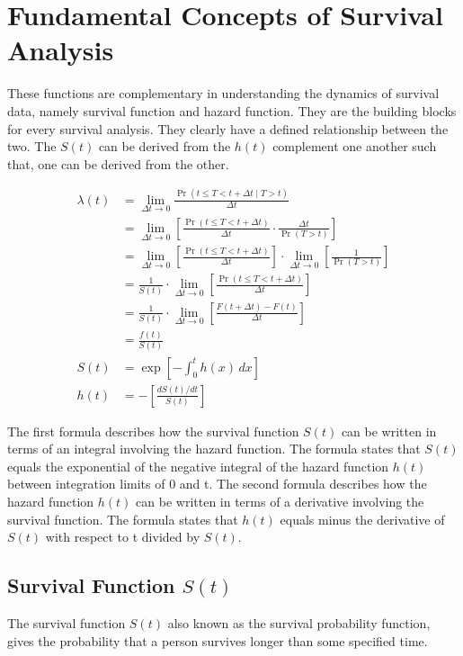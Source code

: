 \documentclass[doublespacing]{report} %
\begin{document}
\section{Fundamental Concepts of Survival Analysis}

These functions are complementary in understanding the dynamics of survival data, namely survival function and hazard function. They are the building blocks for every survival analysis. They clearly have a defined relationship between the two. The \(S\left(t\right)\) can be derived from the \(h\left(t\right)\) complement one another such that, one can be derived from the other.

\begin{align}
\lambda(t) &= \lim_{\Delta t \to 0} \frac{\Pr(t \leq T < t + \Delta t \mid T > t)}{\Delta t} \\
&= \lim_{\Delta t \to 0} \left[ \frac{\Pr(t \leq T < t + \Delta t)}{\Delta t} \cdot \frac{\Delta t}{\Pr(T > t)} \right] \\
&= \lim_{\Delta t \to 0} \left[ \frac{\Pr(t \leq T < t + \Delta t)}{\Delta t} \right] \cdot \lim_{\Delta t \to 0} \left[ \frac{1}{\Pr(T > t)} \right] \\
&= \frac{1}{S(t)} \cdot \lim_{\Delta t \to 0} \left[ \frac{\Pr(t \leq T < t + \Delta t)}{\Delta t} \right] \\
&= \frac{1}{S(t)} \cdot \lim_{\Delta t \to 0} \left[ \frac{F(t + \Delta t) - F(t)}{\Delta t} \right] \\
&= \frac{f(t)}{S(t)}\\
S(t) &= \exp\left[-\int_{0}^{t} h(x) \, dx\right]\\
h(t) &= -\left[\frac{dS(t)/dt}{S(t)}\right]
\end{align}



The first formula describes how the survival function \(S\left(t\right)\) can be written in terms of an integral involving the hazard function. The formula states that \(S\left(t\right) \)equals the exponential of the negative integral of the hazard function \(h\left(t\right) \) between integration limits of 0 and t. 
The second formula describes how the hazard function \(h\left(t\right) \) can be written in terms of a derivative involving the survival function. The formula states that \( h\left(t\right)\) equals minus the derivative of \(S\left(t\right) \) with respect to t divided by \(S\left(t\right)\).


\subsection{\texorpdfstring{Survival Function \( S(t) \)}{Survival Function S(t)}}
The survival function \(S\left(t\right) \) also known as the survival probability function, gives the probability that a person survives longer than some specified time.
\end{document}
